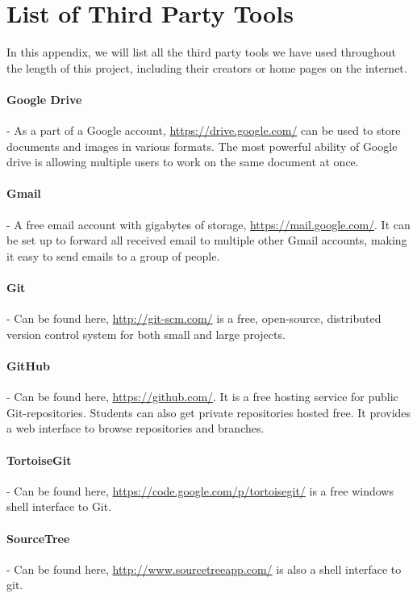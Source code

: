 \documentclass[../document]{subfiles}
\begin{document}
 

\section{List of Third Party Tools}
\label{third_party_tools}

In this appendix, we will list all the third party tools we have used throughout the length of this project, including their creators or home pages on the internet.

\paragraph{Google Drive} - As a part of a Google account, \url{https://drive.google.com/} can be used to store documents and images in various formats. The most powerful ability of Google drive is allowing multiple users to work on the same document at once.

\paragraph{Gmail} - A free email account with gigabytes of storage, \url{https://mail.google.com/}. It can be set up to forward all received email to multiple other Gmail accounts, making it easy to send emails to a group of people.

\paragraph{Git} - Can be found here, \url{http://git-scm.com/} is a free, open-source, distributed version control system for both small and large projects.

\paragraph{GitHub} - Can be found here, \url{https://github.com/}. It is a free hosting service for public Git-repositories. Students can also get private repositories hosted free. It provides a web interface to browse repositories and branches.

\paragraph{TortoiseGit} - Can be found here, \url{https://code.google.com/p/tortoisegit/} is a free windows shell interface to Git.

\paragraph{SourceTree} - Can be found here, \url{http://www.sourcetreeapp.com/} is also a shell interface to git.
\end{document}
